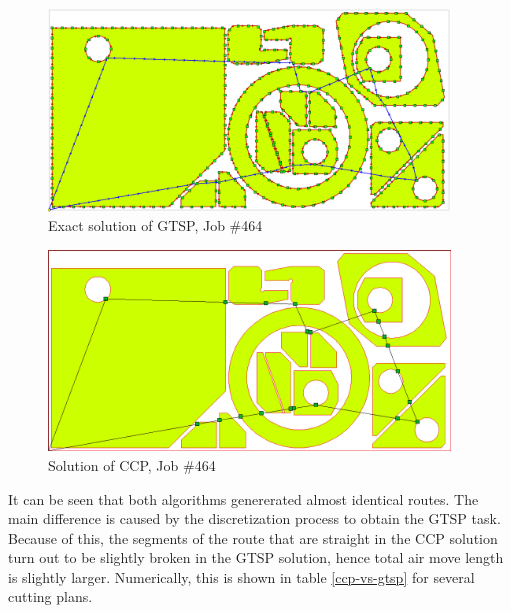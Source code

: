 \documentclass[]{interact}
\theoremstyle{plain}%
\theoremstyle{definition}
\theoremstyle{remark}
\begin{document}
\begin{figure}
  \begin{center}
    \includegraphics[width=0.95\textwidth]{464-gtsp.png}
  \end{center}
  \caption{Exact solution of GTSP, Job \#464}
  \label{gtsp-path}
\end{figure}

\begin{figure}
  \begin{center}
    \includegraphics[width=0.95\textwidth]{464-ccp.png}
  \end{center}
  \caption{Solution of CCP, Job \#464}
  \label{ccp-path}
\end{figure}

It can be seen that both algorithms
genererated almost identical routes.
The main difference is caused by the discretization process
to obtain the GTSP task.
Because of this,
the segments of the route that are straight in the CCP solution
turn out to be slightly broken in the GTSP solution,
hence total air move length is slightly larger.
Numerically, this is shown in table \ref{ccp-vs-gtsp}
for several cutting plans.
\end{document}
